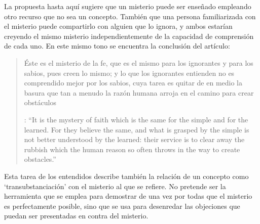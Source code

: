 La propuesta hasta aquí sugiere que un misterio puede ser enseñado empleando otro recurso que no sea un concepto. También que una persona familiarizada con el misterio puede compartirlo con alguien que lo ignora, y ambos estarían creyendo el mismo misterio independientemente de la capacidad de comprensión de cada uno. En este mismo tono se encuentra la conclusión del artículo: \blockquote[{\cite[112]{anscombe1981erp:ot}}: \enquote{It is the mystery of faith which is the same for the simple and for the learned. For they believe the same, and what is grasped by the simple is not better understood by the learned: their service is to clear away the rubbish which the human reason so often throws in the way to create obstacles.}]{Éste es el misterio de la fe, que es el mismo para los ignorantes y para los sabios, pues creen lo mismo; y lo que los ignorantes entienden no es comprendido mejor por los sabios, cuya tarea es quitar de en medio la basura que tan a menudo la razón humana arroja en el camino para crear obstáculos}. Esta tarea de los entendidos describe también la relación de un concepto como `transubstanciación' con el misterio al que se refiere. No pretende ser la herramienta que se emplea para demostrar de una vez por todas que el misterio es perfectamente posible, sino que se usa para desenredar las objeciones que puedan ser presentadas en contra del misterio.

